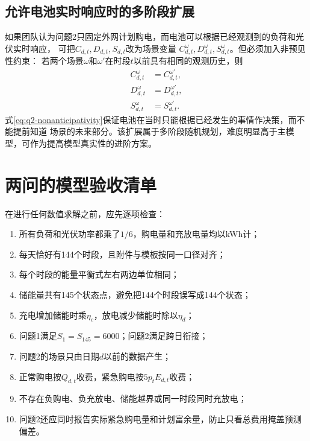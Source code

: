 \documentclass[UTF8,11pt]{ctexart}
\begin{document}
\subsection{允许电池实时响应时的多阶段扩展}

如果团队认为问题2只固定外网计划购电，而电池可以根据已经观测到的负荷和光伏实时响应，
可把$C_{d,t},D_{d,t},S_{d,t}$改为场景变量
$C^{\omega}_{d,t},D^{\omega}_{d,t},S^{\omega}_{d,t}$。但必须加入非预见性约束：
若两个场景$\omega$和$\omega'$在时段$t$以前具有相同的观测历史，则
\begin{equation}
\begin{aligned}
C^{\omega}_{d,t}&=C^{\omega'}_{d,t},\\
D^{\omega}_{d,t}&=D^{\omega'}_{d,t},\\
S^{\omega}_{d,t}&=S^{\omega'}_{d,t}.
\end{aligned}
\label{eq:q2-nonanticipativity}
\end{equation}
式\eqref{eq:q2-nonanticipativity}保证电池在当时只能根据已经发生的事情作决策，而不能提前知道
场景的未来部分。该扩展属于多阶段随机规划，难度明显高于主模型，可作为提高模型真实性的进阶方案。

\section{两问的模型验收清单}

在进行任何数值求解之前，应先逐项检查：
\begin{enumerate}[label=(\arabic*)]
    \item 所有负荷和光伏功率都乘了$1/6$，购电量和充放电量均以kWh计；
    \item 每天恰好有144个时段，且附件与模板按同一口径对齐；
    \item 每个时段的能量平衡式左右两边单位相同；
    \item 储能量共有145个状态点，避免把144个时段误写成144个状态；
    \item 充电增加储能时乘$\eta_c$，放电减少储能时除以$\eta_d$；
    \item 问题1满足$S_1=S_{145}=6000$；问题2满足跨日衔接；
    \item 问题2的场景只由日期$d$以前的数据产生；
    \item 正常购电按$Q_{d,t}$收费，紧急购电按$5p_tE_{d,t}$收费；
    \item 不存在负购电、负充放电、储能越界或同一时段同时充放电；
    \item 问题2还应同时报告实际紧急购电量和计划富余量，防止只看总费用掩盖预测偏差。
\end{enumerate}
\end{document}
